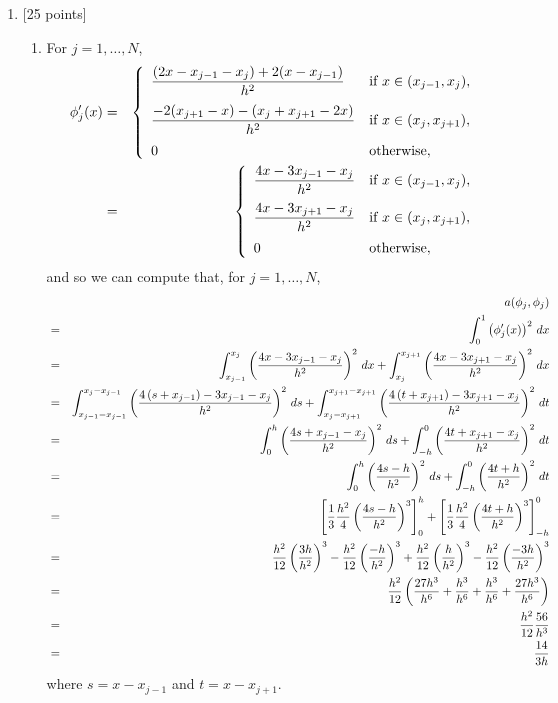 \begin{solution}
\begin{enumerate}
\item {[25 points]}
\begin{enumerate}
\item For $j=1,\ldots,N$,
\begin{eqnarray*}
\phi_j'(x)&=&\left\{\begin{array}{ll}
\displaystyle{{(2x-x_{j-1}-x_j)+2(x-x_{j-1}) \over h^2}} & \displaystyle{\mbox{if }x\in(x_{j-1},x_j)},
\\[10pt]
\displaystyle{{-2(x_{j+1}-x)-(x_j+x_{j+1}-2x) \over h^2}} & \displaystyle{\mbox{if }x\in(x_j,x_{j+1})},
\\[10pt]
0 & \mbox{otherwise},
\end{array}\right.
\\
&=&\left\{\begin{array}{ll}
\displaystyle{{4x-3x_{j-1}-x_j \over h^2}} & \displaystyle{\mbox{if }x\in(x_{j-1},x_j)},
\\[10pt]
\displaystyle{{4x-3x_{j+1}-x_j \over h^2}} & \displaystyle{\mbox{if }x\in(x_j,x_{j+1})},
\\[10pt]
0 & \mbox{otherwise},
\end{array}\right.
\end{eqnarray*}
and so we can compute that, for $j=1,\ldots,N$,
\begin{eqnarray*}
&&a(\phi_j,\phi_j)
\\
&=&\int_0^1\left(\phi_j'(x)\right)^2\,dx
\\
&=&\int_{x_{j-1}}^{x_j}\left({4x-3x_{j-1}-x_j \over h^2}\right)^2\,dx+\int_{x_j}^{x_{j+1}}\left({4x-3x_{j+1}-x_j \over h^2}\right)^2\,dx
\\
&=&\int_{x_{j-1}-x_{j-1}}^{x_j-x_{j-1}}\left({4\left(s+x_{j-1}\right)-3x_{j-1}-x_j \over h^2}\right)^2\,ds+\int_{x_j-x_{j+1}}^{x_{j+1}-x_{j+1}}\left({4\left(t+x_{j+1}\right)-3x_{j+1}-x_j \over h^2}\right)^2\,dt
\\
&=&\int_0^h\left({4s+x_{j-1}-x_j \over h^2}\right)^2\,ds+\int_{-h}^0\left({4t+x_{j+1}-x_j \over h^2}\right)^2\,dt
\\
&=&\int_0^h\left({4s-h \over h^2}\right)^2\,ds+\int_{-h}^0\left({4t+h \over h^2}\right)^2\,dt
\\
&=&\left[{1 \over 3}{h^2 \over 4}\left({4s-h \over h^2}\right)^3\right]_0^h+\left[{1 \over 3}{h^2 \over 4}\left({4t+h \over h^2}\right)^3\right]_{-h}^0
\\
&=&{h^2 \over 12}\left({3h \over h^2}\right)^3-{h^2 \over 12}\left({-h \over h^2}\right)^3+{h^2 \over 12}\left({h \over h^2}\right)^3-{h^2 \over 12}\left({-3h \over h^2}\right)^3
\\
&=&{h^2 \over 12}\left({27h^3 \over h^6}+{h^3 \over h^6}+{h^3 \over h^6}+{27h^3 \over h^6}\right)
\\
&=&{h^2 \over 12}{56 \over h^3}
\\
&=&{14 \over 3h}
\end{eqnarray*}
where $s=x-x_{j-1}$ and $t=x-x_{j+1}$.


\end{enumerate}
\end{enumerate}
\end{solution}
